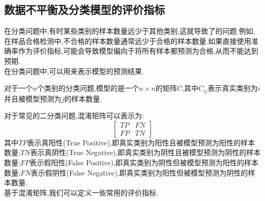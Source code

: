 \documentclass{ctexart}
\begin{document}
\subsection{数据不平衡及分类模型的评价指标}
在分类问题中,有时某些类别的样本数量远少于其他类别,这就导致了的问题.例如,在样品合格检测中,不合格的样本数量通常远少于合格的样本数量.如果直接使用准确率作为评价指标,可能会导致模型偏向于将所有样本都预测为合格,从而不能达到预期.\\
\indent 在分类问题中,可以用来表示模型的预测结果.
\begin{definition}[混淆矩阵]
    对于一个$n$个类别的分类问题,模型的是一个$n\times n$的矩阵$C$,其中$C_{ij}$表示真实类别为$i$并且被模型预测为$j$的样本数量.
\end{definition}
对于常见的二分类问题,混淆矩阵可以表示为:
\[\begin{bmatrix}
    TP & FN\\
    FP & TN
\end{bmatrix}\]
其中$TP$表示真阳性(True Positive),即真实类别为阳性且被模型预测为阳性的样本数量;$TN$表示真阴性(True Negative),即真实类别为阴性且被模型预测为阴性的样本数量;$FP$表示假阳性(False Positive),即真实类别为阴性但被模型预测为阳性的样本数量;$FN$表示假阴性(False Negative),即真实类别为阳性但被模型预测为阴性的样本数量.\\
\indent 基于混淆矩阵,我们可以定义一些常用的评价指标.
\end{document}
